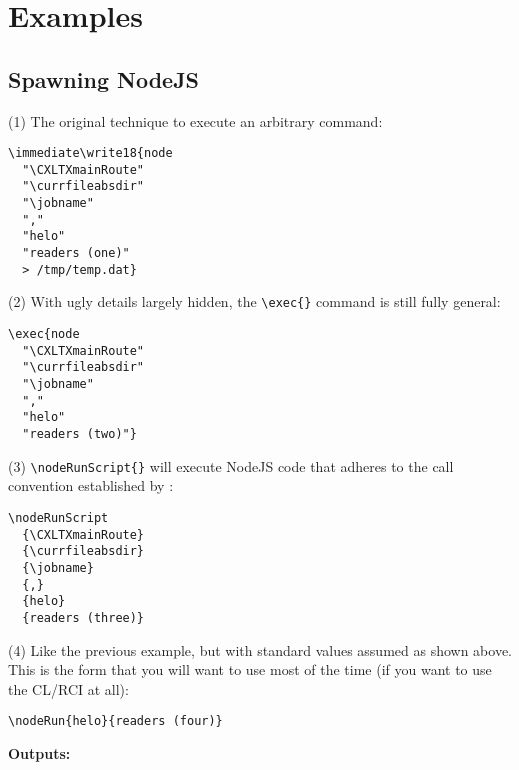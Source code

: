 



\section{Examples}\label{examples}

\subsection{Spawning NodeJS}\label{spawningnodejs}

(1) The original technique to execute an arbitrary command:
\begin{verbatim}
\immediate\write18{node
  "\CXLTXmainRoute"
  "\currfileabsdir"
  "\jobname"
  ","
  "helo"
  "readers (one)"
  > /tmp/temp.dat}
\end{verbatim}

(2) With ugly details largely hidden, the \verb#\exec{}# command is still fully general:
\begin{verbatim}
\exec{node
  "\CXLTXmainRoute"
  "\currfileabsdir"
  "\jobname"
  ","
  "helo"
  "readers (two)"}
\end{verbatim}

(3) \verb#\nodeRunScript{}# will execute NodeJS code that adheres to the call convention established by
\CXLTX:
\begin{verbatim}
\nodeRunScript
  {\CXLTXmainRoute}
  {\currfileabsdir}
  {\jobname}
  {,}
  {helo}
  {readers (three)}
\end{verbatim}

(4) Like the previous example, but with standard values assumed as shown above. This is the form that you
will want to use most of the time (if you want to use the CL/RCI at all):
\begin{verbatim}
\nodeRun{helo}{readers (four)}
\end{verbatim}


{\textbf{Outputs:}}

\immediate{}






